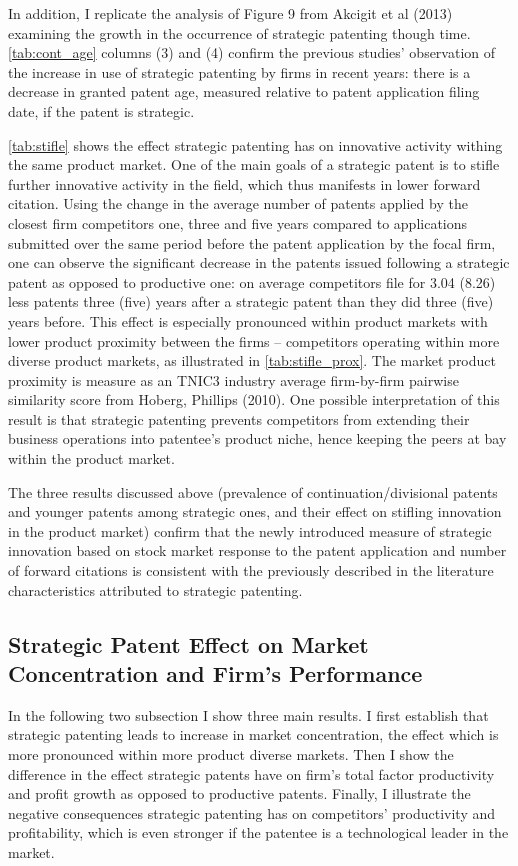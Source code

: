 \documentclass[11pt]{article}
\begin{document}
In addition, I replicate the analysis of Figure 9 from \color{blue} Akcigit et al (2013)\color{black} examining the growth in the occurrence of strategic patenting though time. \autoref{tab:cont_age} columns (3) and (4) confirm the previous studies' observation of the increase in use of strategic patenting by firms in recent years: there is a decrease in granted patent age, measured relative to patent application filing date, if the patent is strategic.  

\autoref{tab:stifle} shows the effect strategic patenting has on innovative activity withing the same product market. One of the main goals of a strategic patent is to stifle further innovative activity in the field, which thus manifests in lower forward citation. Using the change in the average number of patents applied by the closest firm competitors one, three and five years compared to applications submitted over the same period before the patent application by the focal firm, one can observe the significant decrease in the patents issued following a strategic patent as opposed to productive one: on average competitors file for 3.04 (8.26) less patents three (five) years after a strategic patent than they did three (five) years before. This effect is especially pronounced within product markets with lower product proximity between the firms -- competitors operating within more diverse product markets, as illustrated in \autoref{tab:stifle_prox}. The market product proximity is measure as an TNIC3 industry average firm-by-firm pairwise similarity score from \color{blue}Hoberg, Phillips (2010)\color{black}. One possible interpretation of this result is that strategic patenting prevents competitors from extending their business operations into patentee's product niche, hence keeping the peers at bay within the product market. 

The three results discussed above (prevalence of continuation/divisional patents and younger patents among strategic ones, and their effect on stifling innovation in the product market) confirm that the newly introduced measure of strategic innovation based on stock market response to the patent application and number of forward citations is consistent with the previously described in the literature characteristics attributed to strategic patenting.   
   
   
   \subsection{Strategic Patent Effect on Market Concentration and Firm's Performance}
In the following two subsection I show three main results. I first establish that strategic patenting leads to increase in market concentration, the effect which is more pronounced within more product diverse markets. Then I show the difference in the effect strategic patents have on firm’s total factor productivity and profit growth as opposed to productive patents. Finally, I illustrate the negative consequences strategic patenting has on competitors’ productivity and profitability, which is even stronger if the patentee is a technological leader in the market.
\end{document}
